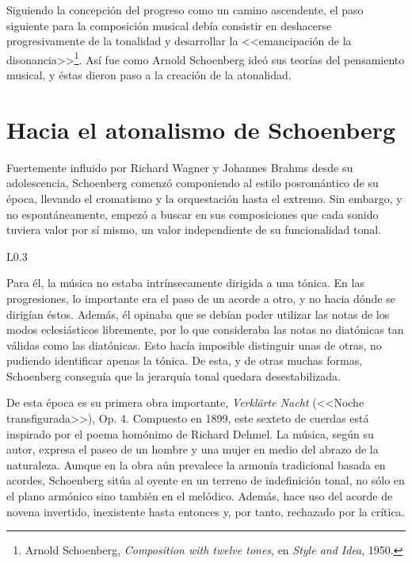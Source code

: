 		Siguiendo la concepción del progreso como un camino ascendente, el paso siguiente para la composición musical debía consistir en deshacerse progresivamente de la tonalidad y desarrollar la <<emancipación de la disonancia>>\footnote{Arnold Schoenberg, \emph{Composition with twelve tones}, en \emph{Style and Idea}, 1950.}. Así fue como Arnold Schoenberg ideó sus teorías del pensamiento musical, y éstas dieron paso a la creación de la atonalidad. \cite{kinney}
	
	\section{Hacia el atonalismo de Schoenberg}
		Fuertemente influido por Richard Wagner y Johannes Brahms desde su adolescencia, Schoenberg comenzó componiendo al estilo posromántico de su época, llevando el cromatismo y la orquestación hasta el extremo. Sin embargo, y no espontáneamente, empezó a buscar en sus composiciones que cada sonido tuviera valor por sí mismo, un valor independiente de su funcionalidad tonal. 
		
		\begin{wrapfigure}{L}{0.3\textwidth}
			\captionsetup{justification=centering, font=footnotesize}
		\end{wrapfigure}
		Para él, la música no estaba intrínsecamente dirigida a una tónica. En las progresiones, lo importante era el paso de un acorde a otro, y no hacia dónde se dirigían éstos. Además, él opinaba que se debían poder utilizar las notas de los modos eclesiásticos libremente, por lo que consideraba las notas no diatónicas tan válidas como las diatónicas. Esto hacía imposible distinguir unas de otras, no pudiendo identificar apenas la tónica. De esta, y de otras muchas formas, Schoenberg conseguía que la jerarquía tonal quedara desestabilizada. \cite{kinney}
		
		De esta época es su primera obra importante, \emph{Verklärte Nacht} (<<Noche transfigurada>>), Op. 4. Compuesto en 1899, este sexteto de cuerdas está inspirado por el poema homónimo de Richard Dehmel. La música, según su autor, expresa el paseo de un hombre y una mujer en medio del abrazo de la naturaleza.  Aunque en la obra aún prevalece la armonía tradicional basada en acordes, Schoenberg sitúa al oyente en un terreno de indefinición tonal, no sólo en el plano armónico sino también en el melódico. Además, hace uso del acorde de novena invertido, inexistente hasta entonces y, por tanto, rechazado por la crítica. \cite{diaz}
				
